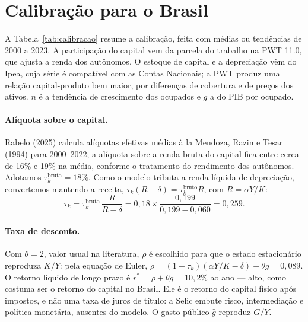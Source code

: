\documentclass[11pt,a4paper]{article}
\begin{document}
\section{Calibração para o Brasil}
\label{sec:calibracao}

A Tabela~\ref{tab:calibracao} resume a calibração, feita com médias ou
tendências de 2000 a 2023. A participação do capital vem da parcela do trabalho
na PWT 11.0, que ajusta a renda dos autônomos. O estoque de capital e a
depreciação vêm do Ipea, cuja série é compatível com as Contas Nacionais; a
PWT produz uma relação capital-produto bem maior, por diferenças de cobertura
e de preços dos ativos. $n$ é a tendência de crescimento dos ocupados e $g$ a
do PIB por ocupado.

\paragraph{Alíquota sobre o capital.} Rabelo (2025) calcula alíquotas
efetivas médias à la Mendoza, Razin e Tesar (1994) para 2000--2022; a alíquota
sobre a renda bruta do capital fica entre cerca de 16\% e 19\% na média,
conforme o tratamento do rendimento dos autônomos. Adotamos
$\tau_k^{\text{bruto}}=18\%$. Como o modelo tributa a renda líquida de
depreciação, convertemos mantendo a receita,
$\tau_k(R-\delta)=\tau_k^{\text{bruto}}R$, com $R=\alpha Y/K$:
\begin{equation}
 \tau_k=\tau_k^{\text{bruto}}\,\frac{R}{R-\delta}=0{,}18\times\frac{0{,}199}{0{,}199-0{,}060}=0{,}259.
\end{equation}

\paragraph{Taxa de desconto.} Com $\theta=2$, valor usual na literatura, $\rho$ é
escolhido para que o estado estacionário reproduza $K/Y$: pela equação de
Euler, $\rho=(1-\tau_k)(\alpha Y/K-\delta)-\theta g=0{,}089$. O retorno líquido
de longo prazo é $r^*=\rho+\theta g=10{,}2\%$ ao ano --- alto, como costuma
ser o retorno do capital no Brasil. Ele é o retorno do capital físico após
impostos, e não uma taxa de juros de título: a Selic embute risco,
intermediação e política monetária, ausentes do modelo. O gasto público
$\hat g$ reproduz $G/Y$.
\end{document}
